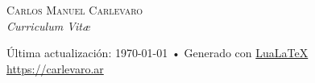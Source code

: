 \documentclass[10pt, a4paper]{article}
\begin{document}
% 
\thispagestyle{empty}
{\Large \textsc{Carlos Manuel Carlevaro}} \\ {\color{DimGrey}\textit{Curriculum Vit{\ae}}}

\hrulefill













% 

\vspace{1cm}
\vfill{}
\begin{center}
	{\scriptsize  Última actualización: \today\- •\-
		Generado con \href{https://en.wikipedia.org/wiki/LuaTeX}{Lua\LaTeX} \\
		\href{https://carlevaro.ar}{https://carlevaro.ar}}
\end{center}
\end{document}
